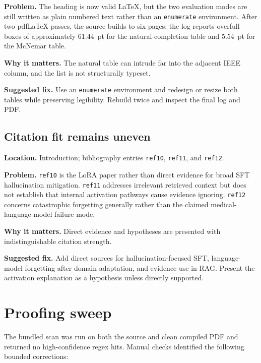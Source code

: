 \documentclass[11pt]{article}
\newcommand{\findinglabel}[1]{\textbf{#1}}
\begin{document}
\findinglabel{Problem.} The heading is now valid LaTeX, but the two evaluation modes are still written as plain numbered text rather than an \texttt{enumerate} environment.  After two pdfLaTeX passes, the source builds to six pages; the log reports overfull boxes of approximately 61.44~pt for the natural-completion table and 5.54~pt for the McNemar table.

\findinglabel{Why it matters.} The natural table can intrude far into the adjacent IEEE column, and the list is not structurally typeset.

\findinglabel{Suggested fix.} Use an \texttt{enumerate} environment and redesign or resize both tables while preserving legibility.  Rebuild twice and inspect the final log and PDF.

\subsection*{Citation fit remains uneven}

\findinglabel{Location.} Introduction; bibliography entries \texttt{ref10}, \texttt{ref11}, and \texttt{ref12}.

\findinglabel{Problem.} \texttt{ref10} is the LoRA paper rather than direct evidence for broad SFT hallucination mitigation.  \texttt{ref11} addresses irrelevant retrieved context but does not establish that internal activation pathways cause evidence ignoring.  \texttt{ref12} concerns catastrophic forgetting generally rather than the claimed medical-language-model failure mode.

\findinglabel{Why it matters.} Direct evidence and hypotheses are presented with indistinguishable citation strength.

\findinglabel{Suggested fix.} Add direct sources for hallucination-focused SFT, language-model forgetting after domain adaptation, and evidence use in RAG.  Present the activation explanation as a hypothesis unless directly supported.

\section*{Proofing sweep}

The bundled scan was run on both the source and clean compiled PDF and returned no high-confidence regex hits.  Manual checks identified the following bounded corrections:
\end{document}
